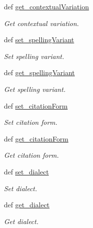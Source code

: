 \begin{DoxyCompactItemize}
def \hyperlink{classlmf_1_1src_1_1core_1_1form__representation_1_1_form_representation_af6e1a07dd4ad7cfb56fc0dd82b38d019}{get\+\_\+contextual\+Variation}
\begin{DoxyCompactList}\small\item\em Get contextual variation. \end{DoxyCompactList}\item 
def \hyperlink{classlmf_1_1src_1_1core_1_1form__representation_1_1_form_representation_a99c2df557be9133fa942834b9a51bee5}{set\+\_\+spelling\+Variant}
\begin{DoxyCompactList}\small\item\em Set spelling variant. \end{DoxyCompactList}\item 
def \hyperlink{classlmf_1_1src_1_1core_1_1form__representation_1_1_form_representation_a7b80312d6adf44b0181b9de5b2105e80}{get\+\_\+spelling\+Variant}
\begin{DoxyCompactList}\small\item\em Get spelling variant. \end{DoxyCompactList}\item 
def \hyperlink{classlmf_1_1src_1_1core_1_1form__representation_1_1_form_representation_a8e9e6290dfeb752fa5b1fc841e27f702}{set\+\_\+citation\+Form}
\begin{DoxyCompactList}\small\item\em Set citation form. \end{DoxyCompactList}\item 
def \hyperlink{classlmf_1_1src_1_1core_1_1form__representation_1_1_form_representation_a5ec57aefa9a58c1ec0e09afba4eef727}{get\+\_\+citation\+Form}
\begin{DoxyCompactList}\small\item\em Get citation form. \end{DoxyCompactList}\item 
def \hyperlink{classlmf_1_1src_1_1core_1_1form__representation_1_1_form_representation_a6c06bc352232a127d6de79e414ff2a13}{set\+\_\+dialect}
\begin{DoxyCompactList}\small\item\em Set dialect. \end{DoxyCompactList}\item 
def \hyperlink{classlmf_1_1src_1_1core_1_1form__representation_1_1_form_representation_a1dec5a7796e6705fc7632393357f1970}{get\+\_\+dialect}
\begin{DoxyCompactList}\small\item\em Get dialect. \end{DoxyCompactList}\item 

\end{DoxyCompactItemize}
